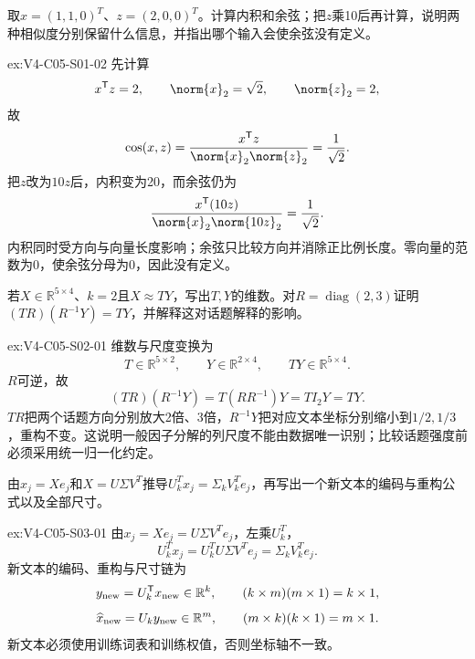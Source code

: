 \begin{SLChapterExercisePairSection}
\begin{exercise}\label{ex:V4-C05-S01-02}
取$x=(1,1,0)^T$、$z=(2,0,0)^T$。计算内积和余弦；把$z$乘10后再计算，说明两种相似度分别保留什么信息，并指出哪个输入会使余弦没有定义。
\end{exercise}
\ifSLFullEdition
{}\label{sol:V4-C05-S01-02}
\begin{chapterexercisesolution}{ex:V4-C05-S01-02}
先计算
\[
x^{\mathsf T}z=2,
\qquad
\norm{x}_2=\sqrt2,
\qquad
\norm{z}_2=2,
\]
故
\[
\cos(x,z)=\frac{x^{\mathsf T}z}{\norm{x}_2\norm{z}_2}
=\frac1{\sqrt2}.
\]
把$z$改为$10z$后，内积变为20，而余弦仍为
\[
\frac{x^{\mathsf T}(10z)}{\norm{x}_2\norm{10z}_2}=\frac1{\sqrt2}.
\]
内积同时受方向与向量长度影响；余弦只比较方向并消除正比例长度。零向量的范数为0，使余弦分母为0，因此没有定义。
\end{chapterexercisesolution}
\fi

\begin{exercise}\label{ex:V4-C05-S02-01}
若$X\in\mathbb R^{5\times4}$、$k=2$且$X\approx TY$，写出$T,Y$的维数。对$R=\operatorname{diag}(2,3)$证明$(TR)(R^{-1}Y)=TY$，并解释这对话题解释的影响。
\end{exercise}
\ifSLFullEdition
{}\label{sol:V4-C05-S02-01}
\begin{chapterexercisesolution}{ex:V4-C05-S02-01}
维数与尺度变换为
\[
T\in\mathbb R^{5\times2},
\qquad
Y\in\mathbb R^{2\times4},
\qquad
TY\in\mathbb R^{5\times4}.
\]
$R$可逆，故
\[
(TR)(R^{-1}Y)=T(RR^{-1})Y=TI_2Y=TY.
\]
$TR$把两个话题方向分别放大2倍、3倍，$R^{-1}Y$把对应文本坐标分别缩小到$1/2,1/3$，重构不变。这说明一般因子分解的列尺度不能由数据唯一识别；比较话题强度前必须采用统一归一化约定。
\end{chapterexercisesolution}
\fi

\begin{exercise}\label{ex:V4-C05-S03-01}
由$x_j=Xe_j$和$X=U\Sigma V^T$推导$U_k^Tx_j=\Sigma_kV_k^Te_j$，再写出一个新文本的编码与重构公式以及全部尺寸。
\end{exercise}
\ifSLFullEdition
{}\label{sol:V4-C05-S03-01}
\begin{chapterexercisesolution}{ex:V4-C05-S03-01}
由$x_j=Xe_j=U\Sigma V^Te_j$，左乘$U_k^T$，
\[
U_k^Tx_j=U_k^TU\Sigma V^Te_j=\Sigma_kV_k^Te_j.
\]
新文本的编码、重构与尺寸链为
\[
y_{\rm new}=U_k^{\mathsf T}x_{\rm new}\in\mathbb R^k,
\qquad
(k\times m)(m\times1)=k\times1,
\]
\[
\widehat x_{\rm new}=U_ky_{\rm new}\in\mathbb R^m,
\qquad
(m\times k)(k\times1)=m\times1.
\]
新文本必须使用训练词表和训练权值，否则坐标轴不一致。
\end{chapterexercisesolution}
\fi


\end{SLChapterExercisePairSection}
